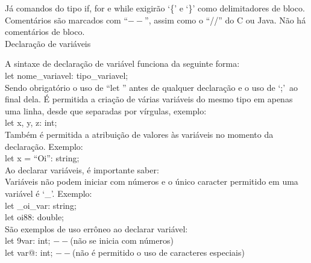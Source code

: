 \documentclass[12pt,a4paper]{article}
\begin{document}



Já comandos do tipo if, for e while exigirão `\{' e `\}' como delimitadores de bloco.
Comentários são marcados com ``$--$'', assim como o ``//'' do C ou Java. Não há comentários de bloco.\\

\hypertarget{label}{\Large{Declaração de variáveis}}\\[0.3cm]
\normalsize

A sintaxe de declaração de variável funciona da seguinte forma:\\

let nome\_variavel: tipo\_variavel;\\

Sendo obrigatório o uso de ``let '' antes de qualquer declaração e o uso de `;'\ ao final dela. É permitida a criação de várias variáveis do mesmo tipo em apenas uma linha, desde que separadas por vírgulas, exemplo:\\

let x, y, z: int;\\

Também é permitida a atribuição de valores às variáveis no momento da declaração. Exemplo:\\

let x = ``Oi'': string;\\

Ao declarar variáveis, é importante saber: \\

Variáveis não podem iniciar com números e o único caracter permitido em uma variável é `\_'. Exemplo: \\

let \_oi\_var: string;\\

let oi88: double;\\

São exemplos de uso errôneo ao declarar variável:\\

let 9var: int; $--$(não se inicia com números)\\

let var@: int; $--$(não é permitido o uso de caracteres especiais)\\
\end{document}
